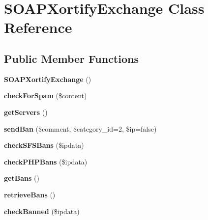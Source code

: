 \hypertarget{class_s_o_a_p_xortify_exchange}{\section{S\-O\-A\-P\-Xortify\-Exchange Class Reference}
\label{class_s_o_a_p_xortify_exchange}
}
\subsection*{Public Member Functions}
\begin{DoxyCompactItemize}
\item 
\hypertarget{class_s_o_a_p_xortify_exchange_add339868d9ad9a22afe8c95564aa063a}{{\bfseries S\-O\-A\-P\-Xortify\-Exchange} ()}\label{class_s_o_a_p_xortify_exchange_add339868d9ad9a22afe8c95564aa063a}

\item 
\hypertarget{class_s_o_a_p_xortify_exchange_a7a4f53c3841dc7806455261af557d514}{{\bfseries check\-For\-Spam} (\$content)}\label{class_s_o_a_p_xortify_exchange_a7a4f53c3841dc7806455261af557d514}

\item 
\hypertarget{class_s_o_a_p_xortify_exchange_a882f365bc81e207dc2123ef707735e82}{{\bfseries get\-Servers} ()}\label{class_s_o_a_p_xortify_exchange_a882f365bc81e207dc2123ef707735e82}

\item 
\hypertarget{class_s_o_a_p_xortify_exchange_a0293acfa4afe0cb5b2816352a35d8ca7}{{\bfseries send\-Ban} (\$comment, \$category\-\_\-id=2, \$ip=false)}\label{class_s_o_a_p_xortify_exchange_a0293acfa4afe0cb5b2816352a35d8ca7}

\item 
\hypertarget{class_s_o_a_p_xortify_exchange_a985a563a84e3e5c54694fcce192bda53}{{\bfseries check\-S\-F\-S\-Bans} (\$ipdata)}\label{class_s_o_a_p_xortify_exchange_a985a563a84e3e5c54694fcce192bda53}

\item 
\hypertarget{class_s_o_a_p_xortify_exchange_aeb1bf9aaee4718870adbd07333490aaf}{{\bfseries check\-P\-H\-P\-Bans} (\$ipdata)}\label{class_s_o_a_p_xortify_exchange_aeb1bf9aaee4718870adbd07333490aaf}

\item 
\hypertarget{class_s_o_a_p_xortify_exchange_aea26db2906896833d32445a698fc4cdc}{{\bfseries get\-Bans} ()}\label{class_s_o_a_p_xortify_exchange_aea26db2906896833d32445a698fc4cdc}

\item 
\hypertarget{class_s_o_a_p_xortify_exchange_a4af29af927aae9aada97ef0c2cd08fa1}{{\bfseries retrieve\-Bans} ()}\label{class_s_o_a_p_xortify_exchange_a4af29af927aae9aada97ef0c2cd08fa1}

\item 
\hypertarget{class_s_o_a_p_xortify_exchange_ae41df0f26620b727f7f63342648f6474}{{\bfseries check\-Banned} (\$ipdata)}\label{class_s_o_a_p_xortify_exchange_ae41df0f26620b727f7f63342648f6474}

\end{DoxyCompactItemize}
